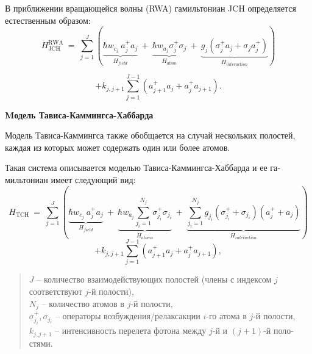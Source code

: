 В приближении вращающейся волны (RWA) \cite{rwa_rabi_1,rwa_rabi_2,ozhigov_qq} гамильтониан JCH определяется естественным образом:
\[
H_{\text{JCH}}^{\text{RWA}}~=~\sum_{j=1}^J \left(\underbrace{\hbar w_{c_j}\ a_j^+a_j}_{\textstyle H_{field}}~+~\underbrace{\hbar w_{a_j}{\sigma_{j}^+\sigma_{j}}}_{\textstyle H_{atom}}~+~\underbrace{g_j{(\sigma_{j}^+a_j+\sigma_{j}a_j^+)}}_{\textstyle H_{interaction}} \right)
\]

\begin{equation}
	+k_{j,j+1}\sum_{j=1}^{J-1}{\left(a_{j+1}^+a_j+a_{j}^+a_{j+1}\right)}.
\end{equation}

\clearpage
\indent\textbf{Mодель Тависа-Каммингса-Хаббарда}

Модель Тависа-Каммингса также обобщается на случай нескольких поло­стей, каждая из которых может содержать один или более атомов.
\begin{figure}[h!]
	\noindent{}
\end{figure}

Такая система описывается моделью Тависа-Каммингса-Хаббарда \cite{tch_photon_blockade,tch_transfer,tch_quality} и ее га­мильтониан имеет следующий вид:
\[
H_{\text{TCH}}~=~\sum_{j=1}^J \left(\underbrace{\hbar w_{c_{j}}\ a_j^+a_{j}}_{\textstyle H_{field}}~+~\underbrace{\hbar w_{a_{j}}\sum_{j_{i}=1}^{N_{j}}{\sigma_{j_i}^+\sigma_{j_i}}}_{\textstyle H_{atoms}}~+~\underbrace{\sum_{j_{i}=1}^{N_{j}}g_{j_i}{(\sigma_{j_i}^{+}+\sigma_{j_i})(a_{j}^{+}+a_{j})}}_{\textstyle H_{interaction}} \right)
\]
\begin{equation}
	+k_{j,j+1}\sum_{j=1}^{J-1}{\left(a_{j+1}^+a_j+a_{j}^+a_{j+1}\right)},
\end{equation}
\begin{quote}
	$J$ -- количество взаимодействующих полостей (члены с индексом $j$ соответствуют $j$-й полости),\\
	$N_{j}$ -- количество атомов в $j$-й полости,\\
	$\sigma_{j_i}^{+},\sigma_{j_i}$ -- операторы возбуждения/релаксакции $i$-го атома в $j$-й полости,\\
	$k_{j,j+1}$ -- интенсивность перелета фотона между $j$-й и $(j+1)$-й поло­стями.
\end{quote}

